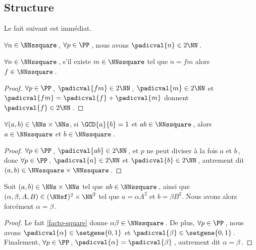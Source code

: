 \subsection{Structure}




\leavevmode
\smallskip

Le fait suivant est immédiat.

\begin{fact} \label{prime-square}
	$\forall n \in \NNssquare$\,,
	$\forall p \in \PP$\,,
	nous avons 
	$\padicval{n} \in 2 \NN$\,.
\end{fact}




\begin{fact} \label{facto-square}
	$\forall n \in \NNssquare$\,, s'il existe $m \in \NNssquare$ tel que $n =  f m$ alors $f  \in \NNssquare$\,.
\end{fact}


\begin{proof}
	$\forall p \in \PP$\,, 
	$\padicval{f m} \in 2 \NN$\,,
	$\padicval{m} \in 2 \NN$
	et
	$\padicval{f m} = \padicval{f} + \padicval{m}$
	donnent
	$\padicval{f} \in 2 \NN$\,.
\end{proof}




\begin{fact} \label{prime-square}
	$\forall (a, b) \in \NNs \times \NNs$, 
	si $\GCD{a}{b} = 1$ et $a b \in \NNssquare$\,,
	alors $a \in \NNssquare$ et $b \in \NNssquare$\,.
\end{fact}


\begin{proof}
	$\forall p \in \PP$\,, $\padicval{ab} \in 2 \NN$\,,
	et $p$ ne peut diviser à la fois $a$ et $b$\,,
	donc
    $\forall p \in \PP$\,, 
    $\padicval{a} \in 2 \NN$ et $\padicval{b} \in 2 \NN$\,,
    autrement dit 
    $(a, b) \in \NNssquare \times \NNssquare$\,.
\end{proof}




\begin{fact} \label{same-square-free}
	Soit $(a, b) \in \NNs \times \NNs$ tel que $a b \in \NNssquare$\,,
	ainsi que $(\alpha, \beta, A, B) \in ( \NNsf )^2 \times \NN^2$ tel que $a = \alpha A^2$ et $b = \beta B^2$.
	Nous avons alors forcément $\alpha = \beta$\,.
\end{fact}

\begin{proof}
	Le fait \ref{facto-square} donne $\alpha \beta \in \NNssquare$\,.
	De plus, $\forall p \in \PP$\,, nous avons 
	$\padicval{\alpha} \in \setgene{0, 1}$
	et
	$\padicval{\beta} \in \setgene{0, 1}$\,.
	Finalement, $\forall p \in \PP$\,, $\padicval{\alpha} = \padicval{\beta}$\,, autrement dit $\alpha = \beta$\,.
\end{proof}


